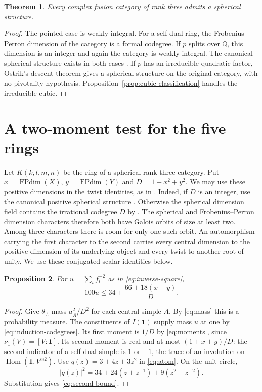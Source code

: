 \documentclass[11pt,a4paper]{article}
\newtheorem{theorem}{Theorem}[section]
\newtheorem{proposition}[theorem]{Proposition}
\theoremstyle{definition}
\theoremstyle{remark}
\newcommand{\Q}{\mathbb Q}
\newcommand{\one}{\mathbf 1}
\newcommand{\FPdim}{\operatorname{FPdim}}
\newcommand{\Hom}{\operatorname{Hom}}
\numberwithin{equation}{section}
\begin{document}
\begin{theorem}\label{thm:spherical}
Every complex fusion category of rank three admits a spherical structure.
\end{theorem}
\begin{proof}
The pointed case is weakly integral. For a self-dual ring, the
Frobenius--Perron dimension of the category is a formal codegree.
If $p$ splits over $\Q$, this dimension is an integer and again the
category is weakly integral. The canonical spherical structure exists
in both cases \cite[Propositions~8.23--8.24]{ENO}. If $p$ has an
irreducible quadratic factor, Ostrik's descent theorem
\cite[Theorem~5.1]{Ostrik} gives a spherical structure on the original
category, with no pivotality hypothesis. Proposition~\ref{prop:cubic-classification}
handles the irreducible cubic.
\end{proof}

\section{A two-moment test for the five rings}\label{sec:reducible-rings}

Let $K(k,l,m,n)$ be the ring of a spherical rank-three category. Put
$x=\FPdim(X)$, $y=\FPdim(Y)$ and $D=1+x^2+y^2$.
We may use these positive dimensions in the twist identities, as in
\cite[Lemma~3.4]{Ostrik}. Indeed, if $D$ is an integer, use the
canonical positive spherical structure \cite[Propositions~8.23--8.24]{ENO}.
Otherwise the spherical dimension field contains the irrational
codegree $D$ by \cite[Corollary~2.15]{Ostrik}. The spherical and
Frobenius--Perron dimension characters therefore both have Galois
orbits of size at least two. Among three characters there is room for
only one such orbit. An automorphism carrying the first character to
the second carries every central dimension to the positive dimension
of its underlying object and every twist to another root of unity.
We use these conjugated scalar identities below.

\begin{proposition}\label{prop:second-bound}
For $u=\sum_i f_i^{-2}$ as in \eqref{eq:inverse-square},
\begin{equation}\label{eq:second-bound}
  100u\leq 34+\frac{66+18(x+y)}{D}.
\end{equation}
\end{proposition}
\begin{proof}
Give $\theta_A$ mass $a_A^2/D^2$ for each central simple $A$.
By \eqref{eq:mass} this is a probability measure. The constituents
of $I(\one)$ supply mass $u$ at one by \eqref{eq:induction-codegrees}.
Its first moment is $1/D$ by \eqref{eq:moments}, since
$\nu_1(V)=[V:\one]$. Its second moment is real and at most
$(1+x+y)/D$: the second indicator of a self-dual simple is $1$ or
$-1$, the trace of an involution on $\Hom(\one,V^{\otimes 2})$.
Use $q(z)=3+4z+3z^2$ in \eqref{eq:atom}. On the unit circle,
\[
 |q(z)|^2=34+24(z+z^{-1})+9(z^2+z^{-2}).
\]
Substitution gives \eqref{eq:second-bound}.
\end{proof}
\end{document}
